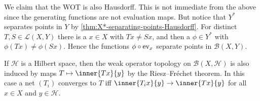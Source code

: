 \documentclass[article, a4paper, 11pt, oneside]{memoir}
\numberwithin{equation}{chapter}
\newcommand{\calB}{\mathcal{B}}
\newcommand{\calL}{\mathcal{L}}
\newcommand{\calH}{\mathcal{H}}
\begin{document}
We claim that the WOT is also Hausdorff. This is not immediate from the above since the generating functions are not evaluation maps. But notice that $Y^*$ separates points in $Y$ by \cref{thm:X*-separating-points-Hausdorff}. For distinct $T,S \in \calL(X,Y)$ there is a $x \in X$ with $Tx \neq Sx$, and then a $\phi \in Y^*$ with $\phi(Tx) \neq \phi(Sx)$. Hence the functions $\phi \circ \mathrm{ev}_x$ separate points in $\calB(X,Y)$.

If $\calH$ is a Hilbert space, then the weak operator topology on $\calB(X,\calH)$ is also induced by maps $T \mapsto \inner{Tx}{y}$ by the Riesz--Fréchet theorem. In this case a net $(T_i)$ converges to $T$ iff $\inner{T_i x}{y} \to \inner{Tx}{y}$ for all $x \in X$ and $y \in \calH$.


\nocite{*}

\printbibliography
\end{document}
